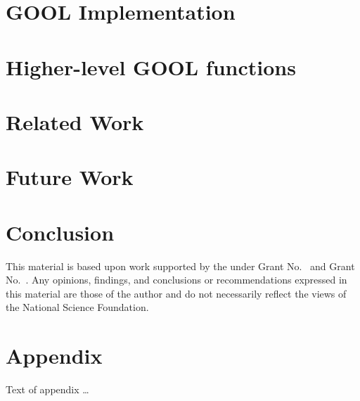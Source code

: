 \documentclass[sigplan,review,anonymous]{acmart}\settopmatter{printfolios=true,printccs=false,printacmref=false}
\begin{document}
\section{GOOL Implementation} \label{implementation}
\section{Higher-level GOOL functions} \label{patterns}
\section{Related Work} \label{related}
\section{Future Work} \label{future}
\section{Conclusion} \label{conclusions}


\begin{acks}                            %
  This material is based upon work supported by the
   under Grant
  No.~ and Grant
  No.~.  Any opinions, findings, and
  conclusions or recommendations expressed in this material are those
  of the author and do not necessarily reflect the views of the
  National Science Foundation.
\end{acks}





\appendix
\section{Appendix}

Text of appendix \ldots
\end{document}
